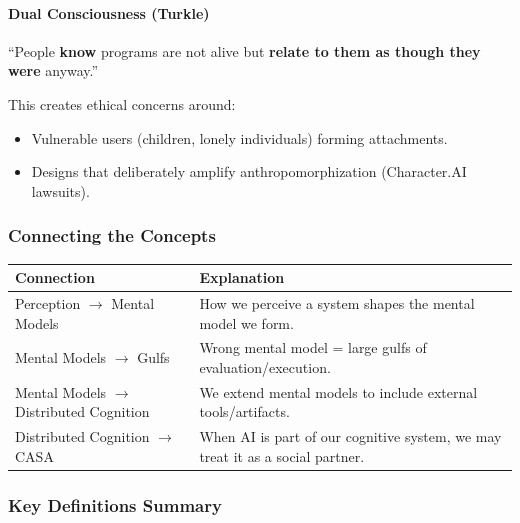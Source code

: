 \paragraph*{Dual Consciousness (Turkle)}
``People \textbf{know} programs are not alive but \textbf{relate to them as though they were} anyway.''

This creates ethical concerns around:
\begin{itemize}
  \item Vulnerable users (children, lonely individuals) forming attachments.
  \item Designs that deliberately amplify anthropomorphization (Character.AI lawsuits).
\end{itemize}

\subsubsection*{Connecting the Concepts}

\begin{center}
\renewcommand{\arraystretch}{1.3}
\begin{tabular}{@{} l p{9cm} @{}}
\toprule
\textbf{Connection} & \textbf{Explanation} \\
\midrule
Perception $\to$ Mental Models & How we perceive a system shapes the mental model we form. \\
Mental Models $\to$ Gulfs & Wrong mental model = large gulfs of evaluation/execution. \\
Mental Models $\to$ Distributed Cognition & We extend mental models to include external tools/artifacts. \\
Distributed Cognition $\to$ CASA & When AI is part of our cognitive system, we may treat it as a social partner. \\
\bottomrule
\end{tabular}
\end{center}

\subsubsection*{Key Definitions Summary}

